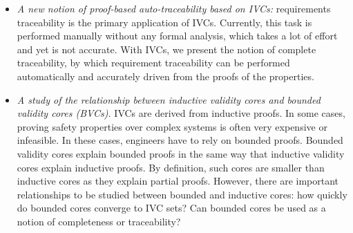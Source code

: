 \begin{itemize}
\item \emph{A new notion of proof-based auto-traceability based on IVCs:} requirements traceability is the primary application of IVCs. Currently, this task is performed manually without any formal analysis, which takes a lot of effort and yet is not accurate. With IVCs, we present the notion of complete traceability, by which requirement traceability can be performed automatically and accurately driven from the proofs of the properties.
    \item  \emph{A study of the relationship between inductive validity cores and bounded validity cores (BVCs).}    IVCs are derived from inductive proofs.  In some cases, proving safety properties over complex systems is often very expensive or infeasible. In these cases, engineers have to rely on bounded proofs.  Bounded validity cores explain bounded proofs in the same way that inductive validity cores explain inductive proofs.  By definition, such cores are smaller than inductive cores as they explain partial proofs.  However, there are important relationships to be studied between bounded and inductive cores: how quickly do bounded cores converge to IVC sets?  Can bounded cores be used as a notion of completeness or traceability?
    

\end{itemize}
